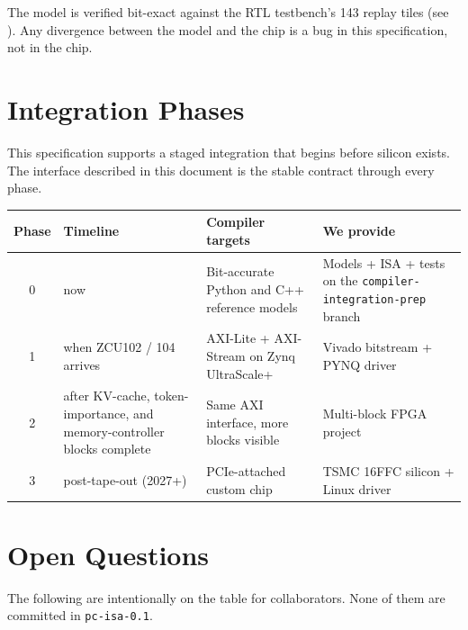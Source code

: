 \documentclass[11pt]{article}
\begin{document}
\noindent
The model is verified bit-exact against the RTL testbench's 143 replay tiles
(see ). Any
divergence between the model and the chip is a bug in this specification,
not in the chip.

\section{Integration Phases}
\label{sec:phases}

This specification supports a staged integration that begins before silicon
exists. The interface described in this document is the stable contract
through every phase.

\begin{table}[ht]
\centering
\small
\renewcommand{\arraystretch}{1.2}
\begin{tabular}{@{}c p{3.0cm} p{4.0cm} p{5.0cm}@{}}
\toprule
Phase & Timeline & Compiler targets & We provide \\
\midrule
0 & now & Bit-accurate Python and C++ reference models & Models + ISA + tests on the \texttt{compiler-integration-prep} branch \\
1 & when ZCU102 / 104 arrives & AXI-Lite + AXI-Stream on Zynq UltraScale+ & Vivado bitstream + PYNQ driver \\
2 & after KV-cache, token-importance, and memory-controller blocks complete & Same AXI interface, more blocks visible & Multi-block FPGA project \\
3 & post-tape-out (2027+) & PCIe-attached custom chip & TSMC 16FFC silicon + Linux driver \\
\bottomrule
\end{tabular}
\end{table}

\section{Open Questions}
\label{sec:open}

The following are intentionally on the table for collaborators. None of them
are committed in \texttt{pc-isa-0.1}.
\end{document}
